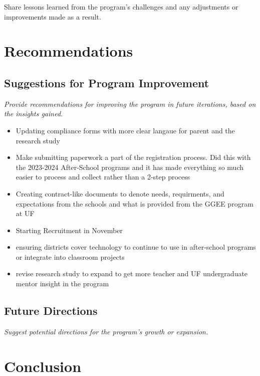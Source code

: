 \documentclass[
]{article}
\providecommand{\tightlist}{%
  \setlength{\itemsep}{0pt}\setlength{\parskip}{0pt}}
\begin{document}
Share lessons learned from the program's challenges and any adjustments
or improvements made as a result.

\hypertarget{recommendations}{%
\section{Recommendations}\label{recommendations}}

\hypertarget{suggestions-for-program-improvement}{%
\subsection{Suggestions for Program
Improvement}\label{suggestions-for-program-improvement}}

\emph{Provide recommendations for improving the program in future
iterations, based on the insights gained.}

\begin{itemize}
\tightlist
\item
  Updating compliance forms with more clear langaue for parent and the
  research study
\item
  Make submitting paperwork a part of the registration process. Did this
  with the 2023-2024 After-School programs and it has made everything so
  much easier to process and collect rather than a 2-step process
\item
  Creating contract-like documents to denote needs, requirments, and
  expectations from the schools and what is provided from the GGEE
  program at UF
\item
  Starting Recruitment in November
\item
  ensuring districts cover technology to continue to use in after-school
  programs or integrate into classroom projects
\item
  revise research study to expand to get more teacher and UF
  undergraduate mentor insight in the program
\end{itemize}

\hypertarget{future-directions}{%
\subsection{Future Directions}\label{future-directions}}

\emph{Suggest potential directions for the program's growth or
expansion.}

\hypertarget{conclusion}{%
\section{Conclusion}\label{conclusion}}
\end{document}
